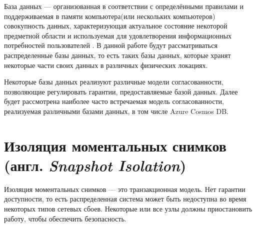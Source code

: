\documentclass[12pt,  openany]{book}
\begin{document}
\par База данных --- организованная в соответствии с определёнными правилами и поддерживаемая в памяти компьютера(или нескольких компьютеров) совокупность данных, характеризующая актуальное состояние некоторой предметной области и используемая для удовлетворения информационных потребностей пользователей \cite{db}.  В данной работе будут рассматриваться распределенные базы данных, то есть таких базы данных,  которые хранят некоторые части своих данных в различных физических локациях.
\par Некоторые базы данных реализуют различные модели согласованности, позволяющие регулировать гарантии, предоставляемые базой данных. Далее будет рассмотрена наиболее часто встречаемая модель согласованности, реализуемая различными базами данных, в том числе Azure Cosmos DB.

\section{Изоляция моментальных снимков (англ.  \textit{Snapshot Isolation})\cite{jepsenConsistencyModels}}
Изоляция моментальных снимков --- это транзакционная модель. Нет гарантии доступности, то есть распределенная система может быть недоступна во время некоторых типов сетевых сбоев. Некоторые или все узлы должны приостановить работу, чтобы обеспечить безопасность.
\end{document}
